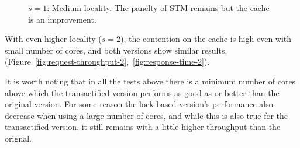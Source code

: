 \documentclass[preprint,11pt]{sigplanconf}
\begin{document}
\begin{figure}
 \centering
 \hfill
 \caption{$s = 1$: Medium locality. The panelty of STM remains but the cache is an improvement.}
\end{figure}

With even higher locality ($s=2$), the contention on the cache is high even with
small number of cores, and both versions show similar results.
(Figure~\ref{fig:request-throughput-2},~\ref{fig:response-time-2}).

It is worth noting that in all the tests above there is a minimum number of
cores above which the transactified version performs as good as or better than
the original version. For some reason the lock based version's performance also
decrease when using a large number of cores, and while this is also true for the
transactified version, it still remains with a little higher throughput than the
orignal.
\end{document}
